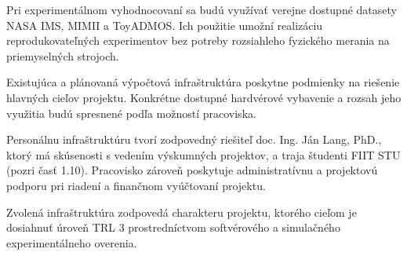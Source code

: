 \documentclass[10pt,a4paper]{article}
\begin{document}
Pri experimentálnom vyhodnocovaní sa budú využívať verejne dostupné datasety NASA IMS, MIMII a ToyADMOS. Ich použitie umožní realizáciu reprodukovateľných experimentov bez potreby rozsiahleho fyzického merania na priemyselných strojoch.

Existujúca a plánovaná výpočtová infraštruktúra poskytne podmienky na riešenie hlavných cieľov projektu. Konkrétne dostupné hardvérové vybavenie a rozsah jeho využitia budú spresnené podľa možností pracoviska.

Personálnu infraštruktúru tvorí zodpovedný riešiteľ doc. Ing. Ján Lang, PhD., ktorý má skúsenosti s vedením výskumných projektov, a traja študenti FIIT STU (pozri časť 1.10). Pracovisko zároveň poskytuje administratívnu a projektovú podporu pri riadení a finančnom vyúčtovaní projektu.

Zvolená infraštruktúra zodpovedá charakteru projektu, ktorého cieľom je dosiahnuť úroveň TRL 3 prostredníctvom softvérového a simulačného experimentálneho overenia.
\end{document}
